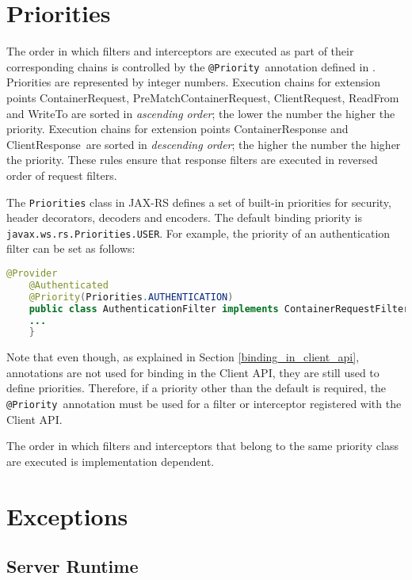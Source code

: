 \section{Priorities}
\label{priorities}

The order in which filters and interceptors are executed as part of their corresponding chains is controlled by the \lstinline{@Priority}\ annotation defined in \cite{jsr250}.
Priorities are represented by integer numbers. Execution chains for extension points ContainerRequest, PreMatchContainerRequest, ClientRequest, ReadFrom and WriteTo are sorted in \emph{ascending order}; the lower the number the higher the priority. Execution chains for extension points ContainerResponse and ClientResponse\ are sorted in \emph{descending order}; the higher the number the higher the priority. These rules ensure that response filters are executed in reversed order of request filters.

The \lstinline{Priorities} class in JAX-RS defines a set of built-in priorities for security, header decorators, decoders and encoders. The default binding priority is \lstinline{javax.ws.rs.Priorities.USER}. For example, the priority of an authentication filter can be set as follows:

\begin{lstlisting}[language=Java]
    @Provider
    @Authenticated
    @Priority(Priorities.AUTHENTICATION)
    public class AuthenticationFilter implements ContainerRequestFilter {
    ...
    }
\end{lstlisting}

Note that even though, as explained in Section \ref{binding_in_client_api}, annotations are not used for binding in the Client API, they are still used to define priorities. Therefore, if a priority other than the default is required, the \lstinline{@Priority}\ annotation must be used for a filter or interceptor registered with the Client API.

The order in which filters and interceptors that belong to the same priority class are executed is implementation dependent.

\section{Exceptions}
\label{exceptions_filters_and_interceptors}

\subsection{Server Runtime}

